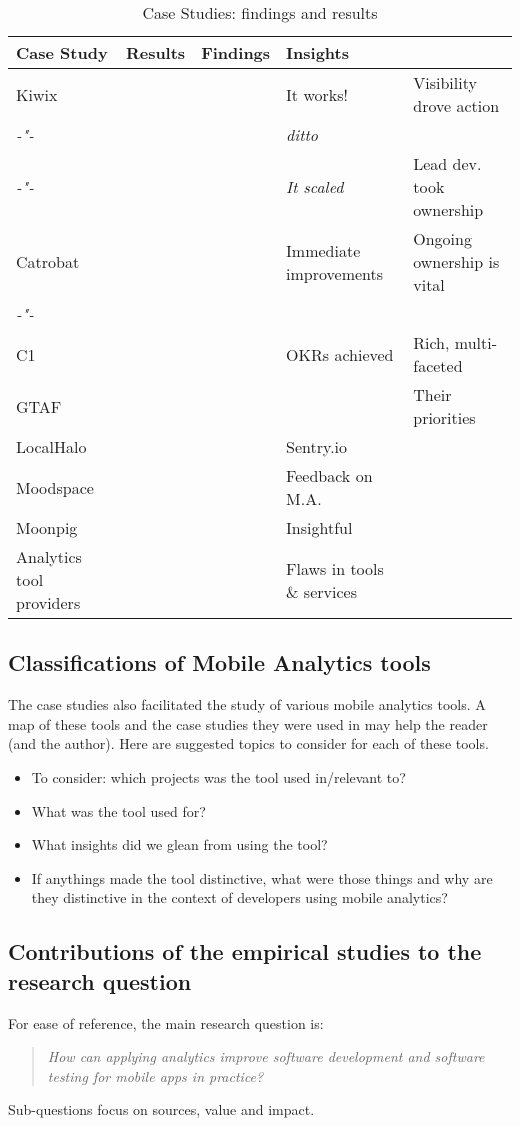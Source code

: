 \begin{table}
    \centering
    \tabcolsep=0.06cm
    \footnotesize
    \begin{tabular}{lllll}\toprule
    Case Study  & Results & Findings    & Insights & \\
    \midrule
    Kiwix                    &     & & It works! & Visibility drove action \\ 
     \textit{-"-}            &     & & \textit{ditto} & \\
     \textit{-"-}            &     & & \textit{It scaled} & Lead dev. took ownership \\
    Catrobat                 &        & & Immediate improvements & Ongoing ownership is vital \\
     \textit{-"-}            &     & & & \\
    C1                       &   & & OKRs achieved & Rich, multi-faceted \\
    GTAF                     &  & & & Their priorities  \\
    LocalHalo                &  & & Sentry.io \\
    Moodspace                &  & & Feedback on M.A. \\
    Moonpig                  &  & & Insightful \\
    Analytics tool providers &  & & Flaws in tools \& services\\
    \bottomrule
    \end{tabular}
    \caption{Case Studies: findings and results}
    \label{tab:case-studies-findings-and-results}
\end{table}


\subsection{Classifications of Mobile Analytics tools}
The case studies also facilitated the study of various mobile analytics tools. A map of these tools and the case studies they were used in may help the reader (and the author). Here are suggested topics to consider for each of these tools.
\begin{itemize}
    \itemsep0em
    \item To consider: which projects was the tool used in/relevant to?
    \item What was the tool used for?
    \item What insights did we glean from using the tool?
    \item If anythings made the tool distinctive, what were those things and why are they distinctive in the context of developers using mobile analytics?
\end{itemize}

\subsection{Contributions of the empirical studies to the research question}
For ease of reference, the main research question is:
\begin{quote}
    \emph{How can applying analytics improve software development and software testing for mobile apps in practice?}    
\end{quote}
Sub-questions focus on sources, value and impact. 